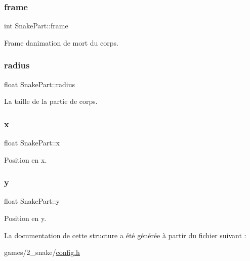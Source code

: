 \subsubsection{\texorpdfstring{frame}{frame}}
{\footnotesize\ttfamily int Snake\+Part\+::frame}



Frame d\textquotesingle{}animation de mort du corps. 

\mbox{\label{struct_snake_part_a21c89b331903355847ec4f6d1e7230ba}} 
\subsubsection{\texorpdfstring{radius}{radius}}
{\footnotesize\ttfamily float Snake\+Part\+::radius}



La taille de la partie de corps. 

\mbox{\label{struct_snake_part_aa89592002258552d0bfa2cb08f993c30}} 
\subsubsection{\texorpdfstring{x}{x}}
{\footnotesize\ttfamily float Snake\+Part\+::x}



Position en x. 

\mbox{\label{struct_snake_part_a2fbe23ceaa2d9c8bce8038e1b3fce35d}} 
\subsubsection{\texorpdfstring{y}{y}}
{\footnotesize\ttfamily float Snake\+Part\+::y}



Position en y. 



La documentation de cette structure a été générée à partir du fichier suivant \+:\begin{DoxyCompactItemize}
\item 
games/2\+\_\+snake/\hyperlink{2__snake_2config_8h}{config.\+h}\end{DoxyCompactItemize}
